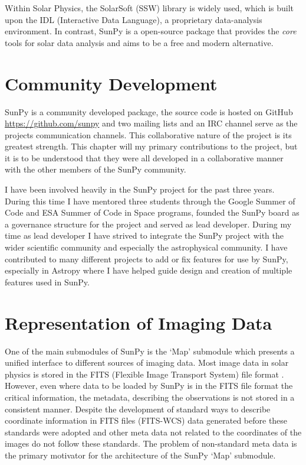 \documentclass[a4paper,12pt,fourier,authoryear,custommargin]{Classes/PhDThesisPSnPDF}
\begin{document}
Within Solar Physics, the SolarSoft (SSW) library \citep{freeland1998} is widely used, which is built upon the IDL (Interactive Data Language), a proprietary data-analysis environment. In contrast, SunPy is a open-source package that provides the \textit{core} tools for solar data analysis and aims to be a free and modern alternative.

\section{Community Development}
SunPy is a community developed package, the source code is hosted on GitHub \url{https://github.com/sunpy} and two mailing lists and an IRC channel serve as the projects communication channels.
This collaborative nature of the project is its greatest strength.
This chapter will my primary contributions to the project, but it is to be understood that they were all developed in a collaborative manner with the other members of the SunPy community.

I have been involved heavily in the SunPy project for the past three years.
During this time I have mentored three students through the Google Summer of Code and ESA Summer of Code in Space programs, founded the SunPy board as a governance structure for the project and served as lead developer.
During my time as lead developer I have strived to integrate the SunPy project with the wider scientific community and especially the astrophysical community.
I have contributed to many different projects to add or fix features for use by SunPy, especially in Astropy where I have helped guide design and creation of multiple features used in SunPy.

\section{Representation of Imaging Data}

One of the main submodules of SunPy is the `Map' submodule which presents a unified interface to different sources of imaging data.
Most image data in solar physics is stored in the FITS (Flexible Image Transport System) file format \citep{pence2010}.
However, even where data to be loaded by SunPy is in the FITS file format the critical information, the metadata, describing the observations is not stored in a consistent manner.
Despite the development of standard ways to describe coordinate information in FITS files (FITS-WCS) \citep{greisen2002,thompson2006} data generated before these standards were adopted and other meta data not related to the coordinates of the images do not follow these standards.
The problem of non-standard meta data is the primary motivator for the architecture of the SunPy `Map' submodule.
\end{document}

